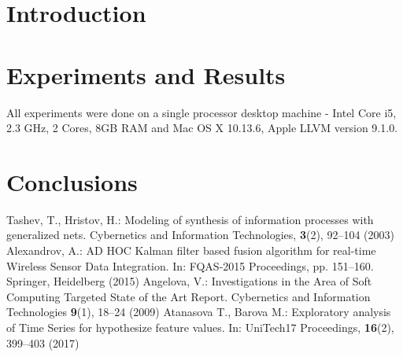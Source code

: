 \documentclass[runningheads]{llncs}
\begin{document}
\section{Introduction}

\section{Experiments and Results}

All experiments were done on a single processor desktop machine - Intel Core i5, 2.3 GHz, 2 Cores, 8GB RAM and Mac OS X 10.13.6, Apple LLVM version 9.1.0.

\section{Conclusions}

\begin{thebibliography}{8}
Tashev, T., Hristov, H.: Modeling of synthesis of information processes with generalized nets. Cybernetics and Information Technologies, \textbf{3}(2), 92--104 (2003) 
Alexandrov, A.: AD HOC Kalman filter based fusion algorithm for real-time Wireless Sensor Data Integration. In: FQAS-2015 Proceedings, pp. 151--160. Springer, Heidelberg (2015)
Angelova, V.: Investigations in the Area of Soft Computing Targeted State of the Art Report. Cybernetics and Information Technologies \textbf{9}(1), 18--24 (2009)
Atanasova T., Barova M.: Exploratory analysis of Time Series for hypothesize feature values. In: UniTech17 Proceedings,  \textbf{16}(2), 399--403 (2017)
\end{thebibliography}
\end{document}
